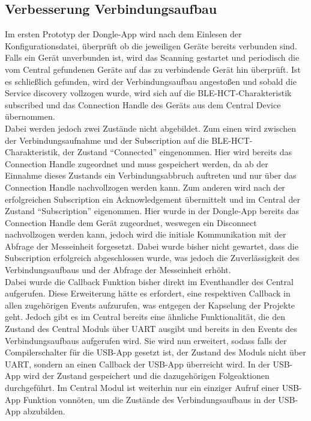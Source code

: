 \subsection{Verbesserung Verbindungsaufbau}
Im ersten Prototyp der Dongle-App wird nach dem Einlesen der Konfigurationsdatei, überprüft ob die jeweiligen Geräte bereits verbunden sind. Falls ein Gerät unverbunden ist, wird das Scanning gestartet und periodisch die vom Central gefundenen Geräte auf das zu verbindende Gerät hin überprüft. Ist es schließlich gefunden, wird der Verbindungsaufbau angestoßen und sobald die Service discovery vollzogen wurde, wird sich auf die BLE-HCT-Charakteristik subscribed und das Connection Handle des Geräts aus dem Central Device übernommen. \\
Dabei werden jedoch zwei Zustände nicht abgebildet. Zum einen wird zwischen der Verbindungsaufnahme und der Subscription auf die BLE-HCT-Charakteristik, der Zustand ``Connected'' eingenommen. Hier wird bereits das Connection Handle zugeordnet und muss gespeichert werden, da ab der Einnahme dieses Zustands ein Verbindungsabbruch auftreten und nur über das Connection Handle nachvollzogen werden kann. Zum anderen wird nach der erfolgreichen Subscription ein Acknowledgement übermittelt und im Central der Zustand ``Subscription'' eigenommen. Hier wurde in der Dongle-App bereits das Connection Handle dem Gerät zugeordnet, weswegen ein Disconnect nachvollzogen werden kann, jedoch wird die initiale Kommunikation mit der Abfrage der Messeinheit forgesetzt. Dabei wurde bisher nicht gewartet, dass die Subscription erfolgreich abgeschlossen wurde, was jedoch die Zuverlässigkeit des Verbindungsaufbaus und der Abfrage der Messeinheit erhöht.\\
Dabei wurde die Callback Funktion bisher direkt im Eventhandler des Central aufgerufen. Diese Erweiterung hätte es erfordert, eine respektiven Callback in allen zugehörigen Events aufzurufen, was entgegen der Kapselung der Projekte geht. Jedoch gibt es im Central bereits eine ähnliche Funktionalität, die den Zustand des Central Moduls über UART ausgibt und bereits in den Events des Verbindungsaufbaus aufgerufen wird. Sie wird nun erweitert, sodass falls der Compilerschalter für die USB-App gesetzt ist, der Zustand des Moduls nicht über UART, sondern an einen Callback der USB-App überreicht wird. In der USB-App wird der Zustand gespeichert und die dazugehörigen Folgeaktionen durchgeführt. Im Central Modul ist weiterhin nur ein einziger Aufruf einer USB-App Funktion vonnöten, um die Zustände des Verbindungsaufbaus in der USB-App abzubilden.

